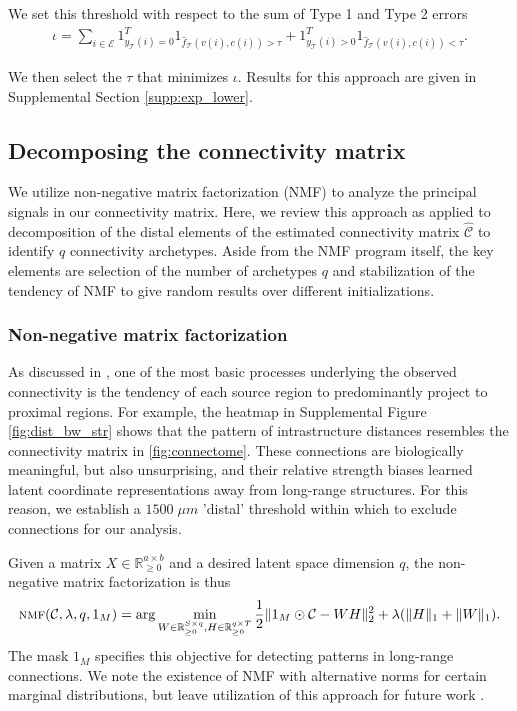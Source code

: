 We set this threshold with respect to the sum of Type 1 and Type 2 errors
\begin{eqnarray*}
\iota = \sum_{i \in \mathcal E} 1_{y_{\mathcal T}(i) = 0}^T 1_{\hat f_{\mathcal T}(v(i),c(i)) > \tau} + 1_{y_{\mathcal T}(i) > 0}^T 1_{\hat f_{\mathcal T}(v(i),c(i)) < \tau}  .
\end{eqnarray*}

We then select the $\tau$ that minimizes $\iota$.
Results for this approach are given in Supplemental Section \ref{supp:exp_lower}.

\newpage

\subsection{Decomposing the connectivity matrix}
\label{supp_sec:matrix_factor_methods}

We utilize non-negative matrix factorization (NMF) to analyze the principal signals in our connectivity matrix.
Here, we review this approach as applied to decomposition of the distal elements of the estimated connectivity matrix $\widehat {\mathcal C}$ to identify $q$ connectivity archetypes.
Aside from the NMF program itself, the key elements are selection of the number of archetypes $q$ and stabilization of the tendency of NMF to give random results over different initializations. 

\subsubsection{Non-negative matrix factorization}

As discussed in \citet{Knox2019-ot}, one of the most basic processes underlying the observed connectivity is the tendency of each source region to predominantly project to proximal regions.
For example, the heatmap in Supplemental Figure \ref{fig:dist_bw_str} shows that the pattern of intrastructure distances resembles the connectivity matrix in \ref{fig:connectome}.
These connections are biologically meaningful, but also unsurprising, and their relative strength biases learned latent coordinate representations away from long-range structures.
For this reason, we establish a $1500 \; \mu m$ 'distal' threshold within which to exclude connections for our analysis.

Given a matrix $X \in \mathbb R_{\geq 0}^{a \times b}$ and a desired latent space dimension $q$, the non-negative matrix factorization is thus
\begin{eqnarray*}
\textsc{nmf} (\mathcal C, \lambda, q,1_{M}) = \arg \min_{W \in \mathbb R_{\geq 0}^{S \times q}, H\in \mathbb R_{\geq 0}^{q \times T}} \frac{1}{2}\| 1_{M} \odot \mathcal C - WH\|_2^2  + \lambda  (\|H \|_1 + \|W \|_1) .
\end{eqnarray*}
The mask $1_M$ specifies this objective for detecting patterns in long-range connections.
We note the existence of NMF with alternative norms for certain marginal distributions, but leave utilization of this approach for future work \citep{Brunet2004-gi}.

